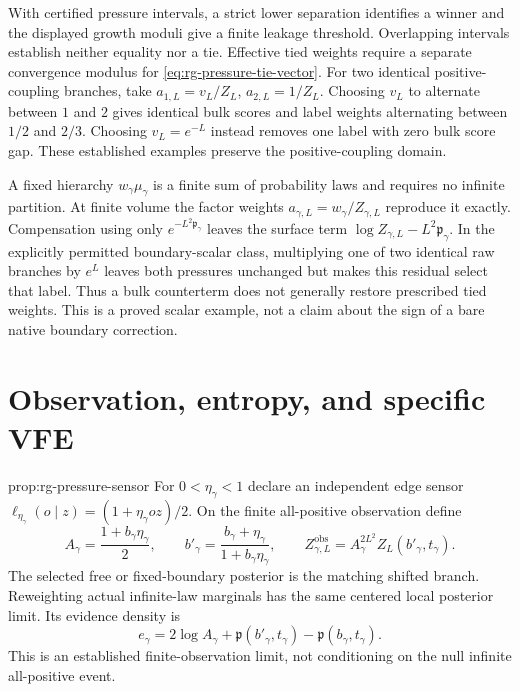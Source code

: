 With certified pressure intervals, a strict lower separation identifies a
winner and the displayed growth moduli give a finite leakage threshold.
Overlapping intervals establish neither equality nor a tie. Effective tied
weights require a separate convergence modulus for
\cref{eq:rg-pressure-tie-vector}. For two identical positive-coupling
branches, take $a_{1,L}=v_L/Z_L$, $a_{2,L}=1/Z_L$.
Choosing $v_L$ to alternate between $1$ and $2$ gives identical bulk scores
and label weights alternating between $1/2$ and $2/3$.
Choosing $v_L=e^{-L}$ instead removes one label with zero bulk score gap.
These established examples preserve the positive-coupling domain.

A fixed hierarchy $w_\gamma\mu_\gamma$ is a finite sum of probability
laws and requires no infinite partition. At finite volume the factor
weights $a_{\gamma,L}=w_\gamma/Z_{\gamma,L}$ reproduce it exactly.
Compensation using only $e^{-L^2\mathfrak p_\gamma}$ leaves the surface
term $\log Z_{\gamma,L}-L^2\mathfrak p_\gamma$. In the explicitly
permitted boundary-scalar class, multiplying one of two identical raw
branches by $e^L$ leaves both pressures unchanged but makes this residual
select that label. Thus a bulk counterterm does not generally restore
prescribed tied weights. This is a proved scalar example, not a claim
about the sign of a bare native boundary correction. 

\section{Observation, entropy, and specific VFE}
\label{sec:rg-pressure-vfe}

{prop:rg-pressure-sensor}
For $0<\eta_\gamma<1$ declare an independent edge sensor
$\ell_{\eta_\gamma}(o\mid z)=(1+\eta_\gamma oz)/2$.
On the finite all-positive observation define
\begin{equation}
 A_\gamma=\frac{1+b_\gamma\eta_\gamma}{2},\qquad
 b'_\gamma=\frac{b_\gamma+\eta_\gamma}{1+b_\gamma\eta_\gamma},\qquad
 Z^{\mathrm{obs}}_{\gamma,L}
 =A_\gamma^{2L^2}Z_L(b'_\gamma,t_\gamma).
 \label{eq:rg-pressure-sensor}
\end{equation}
The selected free or fixed-boundary posterior is the matching shifted
branch. Reweighting actual infinite-law marginals has the same centered
local posterior limit. Its evidence density is
\begin{equation}
 e_\gamma=2\log A_\gamma+
 \mathfrak p(b'_\gamma,t_\gamma)-\mathfrak p(b_\gamma,t_\gamma).
 \label{eq:rg-pressure-evidence}
\end{equation}
This is an established finite-observation limit, not conditioning on the
null infinite all-positive event. 

